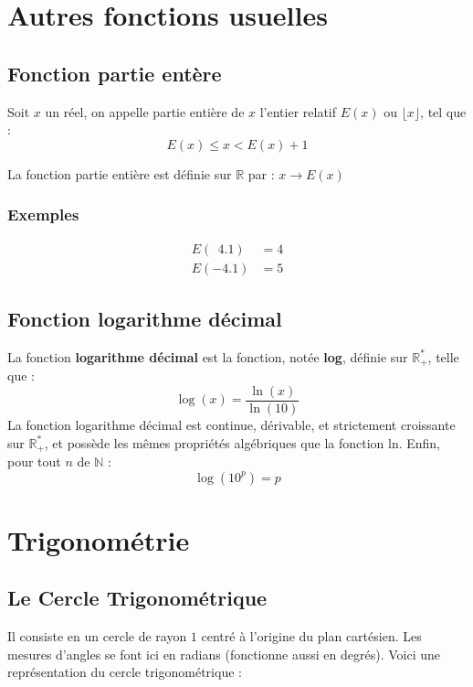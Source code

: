 \documentclass{report}
\newcommand{\R}{\mathbb{R}}
\begin{document}
    \newpage

    \section{Autres fonctions usuelles}

      \subsection{Fonction partie entère}

        Soit $x$ un réel, on appelle partie entière de $x$ l'entier relatif $E(x)$ ou $\lfloor x \rfloor$, tel que : 
        \[\boxed{E(x) \le x < E(x) +1}\]

        La fonction partie entière est définie sur $\R$ par : $x \to E(x)$

        \subsubsection*{Exemples}

        \begin{align}
          E(~~4.1) &= 4\\
          E(-4.1) &= 5
        \end{align}

      \subsection{Fonction logarithme décimal}

        La fonction \textbf{logarithme décimal} est la fonction, notée \textbf{log}, définie sur $\R^*_+$, telle que :
        \[\log(x) = \frac{\ln(x)}{\ln(10)}\]
        La fonction logarithme décimal est continue, dérivable, et strictement croissante sur $\R^*_+$, et possède les mêmes propriétés algébriques que la fonction ln. Enfin, pour tout $n$ de $\mathbb{N}$ : 
        \[\log(10^p) = p\]

    \newpage


    \section{Trigonométrie}

    \subsection{Le Cercle Trigonométrique}

    Il consiste en un cercle de rayon $1$ centré à l'origine du plan cartésien. Les mesures d'angles se font ici en radians (fonctionne aussi en degrés). Voici une représentation du cercle trigonométrique :
\end{document}

